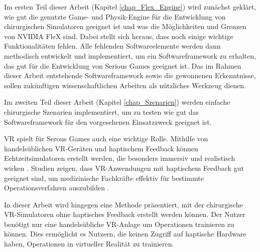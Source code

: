 Im ersten Teil dieser Arbeit (Kapitel \ref{chap_Flex_Engine}) wird zunächst geklärt, wie gut die genutzte Game- und Physik-Engine für die Entwicklung von chirurgischen Simulatoren geeignet ist und was die Möglichkeiten und Grenzen von NVIDIA FleX sind. Dabei stellt sich heraus, dass noch einige wichtige Funktionalitäten fehlen. Alle fehlenden Softwareelemente werden dann methodisch entwickelt und implementiert, um ein Softwareframework zu erhalten, das gut für die Entwicklung von Serious Games geeignet ist. Das im Rahmen dieser Arbeit entstehende Softwareframework sowie die gewonnenen Erkenntnisse, sollen zukünftigen wissenschaftlichen Arbeiten als nützliches Werkzeug dienen.

Im zweiten Teil dieser Arbeit (Kapitel \ref{chap_Szenarien}) werden einfache chirurgische Szenarien implementiert, um zu testen wie gut das Softwareframework für den vorgesehenen Einsatzzweck geeignet ist. 

\ac{VR} spielt für Serous Games auch eine wichtige Rolle. 
Mithilfe von handelsüblichen VR-Geräten und haptischem Feedback können Echtzeitsimulatoren erstellt werden, die besonders immersiv und realistisch wirken \cite{VRSim20}. 
Studien zeigen, dass VR-Anwendungen mit haptischem Feedback gut geeignet sind, um medizinische Fachkräfte effektiv für bestimmte Operationsverfahren auszubilden  \cite{VRHapticSim}.

In dieser Arbeit wird hingegen eine Methode präsentiert, mit der chirurgische VR-Simulatoren ohne haptisches Feedback erstellt werden können. Der Nutzer benötigt nur eine handelsübliche VR-Anlage 
um Operationen trainieren zu können. 
Dies ermöglicht es Nutzern, die keinen Zugriff auf haptische Hardware haben, Operationen in virtueller Realität zu trainieren. 



